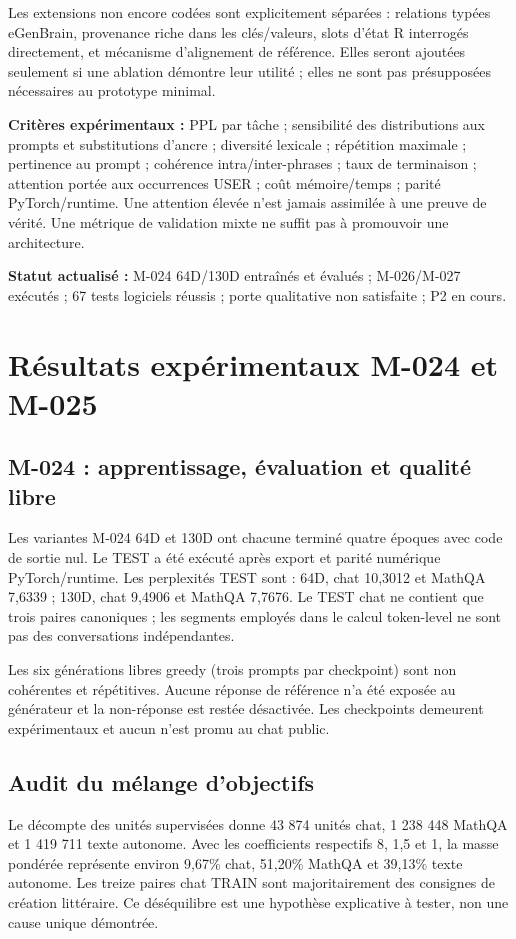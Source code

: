 \documentclass[11pt,a4paper]{report}
\begin{document}
Les extensions non encore codées sont explicitement séparées : relations typées eGenBrain, provenance riche dans les clés/valeurs, slots d'état R interrogés directement, et mécanisme d'alignement de référence. Elles seront ajoutées seulement si une ablation démontre leur utilité ; elles ne sont pas présupposées nécessaires au prototype minimal.

\textbf{Critères expérimentaux :} PPL par tâche ; sensibilité des distributions aux prompts et substitutions d'ancre ; diversité lexicale ; répétition maximale ; pertinence au prompt ; cohérence intra/inter-phrases ; taux de terminaison ; attention portée aux occurrences USER ; coût mémoire/temps ; parité PyTorch/runtime. Une attention élevée n'est jamais assimilée à une preuve de vérité. Une métrique de validation mixte ne suffit pas à promouvoir une architecture.

\textbf{Statut actualisé :} M-024 64D/130D entraînés et évalués ; M-026/M-027 exécutés ; 67 tests logiciels réussis ; porte qualitative non satisfaite ; P2 en cours.


\section{Résultats expérimentaux M-024 et M-025}
\subsection{M-024 : apprentissage, évaluation et qualité libre}
Les variantes M-024 64D et 130D ont chacune terminé quatre époques avec code de sortie nul. Le TEST a été exécuté après export et parité numérique PyTorch/runtime. Les perplexités TEST sont : 64D, chat 10,3012 et MathQA 7,6339 ; 130D, chat 9,4906 et MathQA 7,7676. Le TEST chat ne contient que trois paires canoniques ; les segments employés dans le calcul token-level ne sont pas des conversations indépendantes.

Les six générations libres greedy (trois prompts par checkpoint) sont non cohérentes et répétitives. Aucune réponse de référence n'a été exposée au générateur et la non-réponse est restée désactivée. Les checkpoints demeurent expérimentaux et aucun n'est promu au chat public.

\subsection{Audit du mélange d'objectifs}
Le décompte des unités supervisées donne 43 874 unités chat, 1 238 448 MathQA et 1 419 711 texte autonome. Avec les coefficients respectifs 8, 1,5 et 1, la masse pondérée représente environ 9,67\% chat, 51,20\% MathQA et 39,13\% texte autonome. Les treize paires chat TRAIN sont majoritairement des consignes de création littéraire. Ce déséquilibre est une hypothèse explicative à tester, non une cause unique démontrée.
\end{document}
